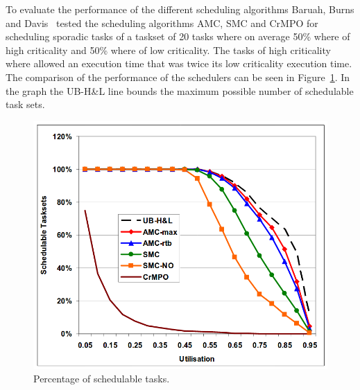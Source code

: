 To evaluate the performance of the different scheduling algorithms Baruah, Burns and Davis~\cite{baruah2011} tested the scheduling algorithms AMC, SMC and CrMPO for scheduling sporadic tasks of a taskset of 20 tasks where on average 50\% where of high criticality and 50\% where of low criticality. The tasks of high criticality where allowed an execution time that was twice its low criticality execution time. The comparison of the performance of the schedulers can be seen in Figure~\ref{fig:schedulers}. In the graph the UB-H\&L line bounds the maximum possible number of schedulable task sets.


\begin{figure}[H]
\centering
\includegraphics[width=\textwidth]{./img/literature_schedulers.png}
\caption{Percentage of schedulable tasks.~\cite{baruah2011}}\label{fig:schedulers}
\end{figure}

